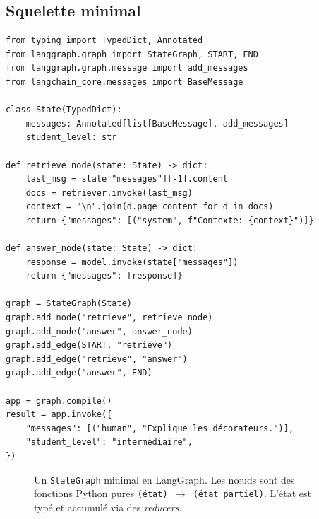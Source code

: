 \documentclass[11pt,a4paper]{article}
\begin{document}
\subsection{Squelette minimal}

\begin{verbatim}
from typing import TypedDict, Annotated
from langgraph.graph import StateGraph, START, END
from langgraph.graph.message import add_messages
from langchain_core.messages import BaseMessage

class State(TypedDict):
    messages: Annotated[list[BaseMessage], add_messages]
    student_level: str

def retrieve_node(state: State) -> dict:
    last_msg = state["messages"][-1].content
    docs = retriever.invoke(last_msg)
    context = "\n".join(d.page_content for d in docs)
    return {"messages": [("system", f"Contexte: {context}")]}

def answer_node(state: State) -> dict:
    response = model.invoke(state["messages"])
    return {"messages": [response]}

graph = StateGraph(State)
graph.add_node("retrieve", retrieve_node)
graph.add_node("answer", answer_node)
graph.add_edge(START, "retrieve")
graph.add_edge("retrieve", "answer")
graph.add_edge("answer", END)

app = graph.compile()
result = app.invoke({
    "messages": [("human", "Explique les décorateurs.")],
    "student_level": "intermédiaire",
})
\end{verbatim}

\begin{figure}[h]
\centering
{}
\caption{Un \texttt{StateGraph} minimal en LangGraph. Les nœuds sont des fonctions Python pures \texttt{(état) $\to$ (état partiel)}. L'état est typé et accumulé via des \emph{reducers}.}
\end{figure}
\end{document}
